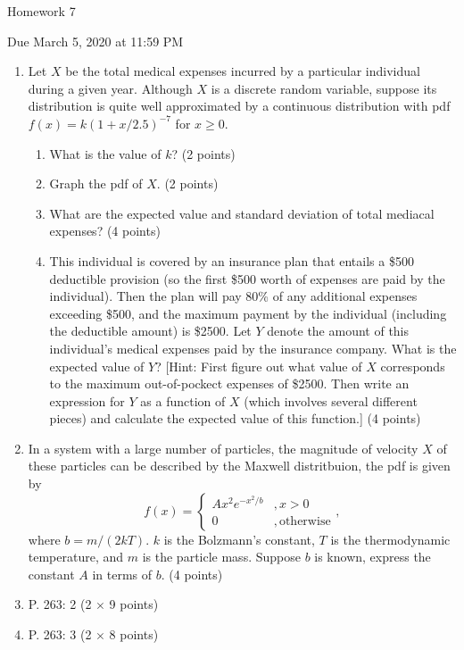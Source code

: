 \documentclass{article}
\begin{document}
\begin{center} \LARGE
Homework 7
\end{center}
\begin{center} \Large
Due March 5, 2020 at 11:59 PM 
\end{center}



\begin{enumerate}
	\item Let $X$ be the total medical expenses incurred by a particular individual during a given year. Although $X$ is a discrete random variable, suppose its distribution is quite well approximated by a continuous distribution with pdf $f(x) = k(1 + x/2.5)^{-7}$ for $x \geq 0$.
	\begin{enumerate}
		\item What is the value of $k$? (2 points)
		\item Graph the pdf of $X$. (2 points)
		\item What are the expected value and standard deviation of total mediacal expenses? (4 points)
		\item 
		This individual is covered by an insurance plan that entails a \$500 deductible provision (so the first \$500 worth of expenses are paid by the individual). Then the plan will pay 80\% of any additional expenses exceeding \$500, and the maximum payment by the individual (including the deductible amount) is \$2500. Let $Y$ denote the amount of this individual's medical expenses paid by the insurance company. What is the expected value of $Y$? [Hint: First figure out what value of $X$ corresponds to the maximum out-of-pockect expenses of \$2500. Then write an expression for $Y$ as a function of $X$ (which involves several different pieces) and calculate the expected value of this function.] (4 points)
	\end{enumerate}

	\item 
	In a system with a large number of particles, the magnitude of velocity $X$ of these particles can be described by the Maxwell distritbuion, the pdf is given by
	\[f(x) = \begin{cases}
		 A x^2 e^{-x^2/b} & , x > 0\\
		 0 & , \mathrm{otherwise}
	\end{cases},\]
	where $b = m/(2kT)$. $k$ is the Bolzmann's constant, $T$ is the thermodynamic temperature, and $m$ is the particle mass. Suppose $b$ is known, express the constant $A$ in terms of $b$. (4 points)
	
	\item P. 263: 2 (2 $\times$ 9 points)
	\item P. 263: 3 (2 $\times$ 8 points)
\end{enumerate}
% 
%
\end{document}
